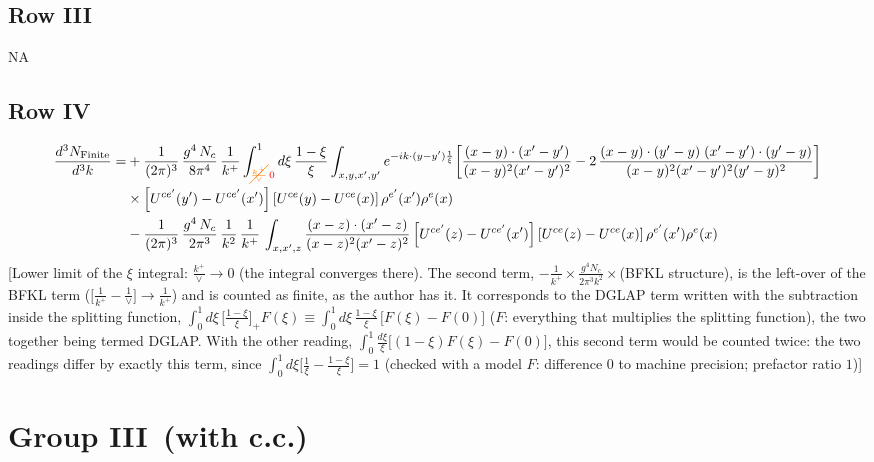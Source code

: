 \documentclass[9pt]{article}
\numberwithin{equation}{section}
\begin{document}
\subsection{Row III}
\textsc{NA}
\subsection{Row IV}
\begin{align}
\frac{d^{3}N_{\rm Finite}}{d^{3}k}= &  +\frac{1}{(2\pi)^{3}}\,\frac{g^{4}\,N_{c}}{8\pi^{4}}\,\frac{1}{k^{+}}\int_{{\color{orange}\cancel{\frac{k^{+}}{\vee}}}\,{\color{red}0}}^{1}d\xi\,\frac{1-\xi}{\xi}\int_{x,y,x',y'}e^{-ik\cdot(y-y')\frac{1}{\xi}}\bigg[\frac{(x-y)\cdot(x'-y')}{(x-y)^{2}(x'-y')^{2}}-2\,\frac{(x-y)\cdot(y'-y)\;(x'-y')\cdot(y'-y)}{(x-y)^{2}(x'-y')^{2}(y'-y)^{2}}\bigg]\notag\\
&\times\left[U^{ce'}(y') - U^{ce'}(x')\right]\left[U^{ce}(y) - U^{ce}(x)\right]\rho^{e'}(x')\rho^{e}(x)\notag \\ & -\frac{1}{(2\pi)^{3}}\,\frac{g^{4}\,N_{c}}{2\pi^{3}}\,\frac{1}{k^{2}}\,\frac{1}{k^{+}}\,\int_{x,x',z}\frac{(x-z)\cdot(x'-z)}{(x-z)^{2}(x'-z)^{2}}\left[U^{ce'}(z) - U^{ce'}(x')\right]\left[U^{ce}(z) - U^{ce}(x)\right]\rho^{e'}(x')\rho^{e}(x)
\end{align} {\color{red}[Lower limit of the $\xi$ integral: $\frac{k^{+}}{\vee}\to0$ (the integral converges there). The second term, $-\frac{1}{k^{+}}\times\frac{g^{4}N_{c}}{2\pi^{3}k^{2}}\times$(BFKL structure), is the left-over of the BFKL term ($\big[\frac{1}{k^{+}}-\frac{1}{\vee}\big]\to\frac{1}{k^{+}}$) and is counted as finite, as the author has it. It corresponds to the DGLAP term written with the subtraction inside the splitting function, $\int_{0}^{1}d\xi\,\big[\frac{1-\xi}{\xi}\big]_{+}F(\xi)\equiv\int_{0}^{1}d\xi\,\frac{1-\xi}{\xi}\,\big[F(\xi)-F(0)\big]$ ($F$: everything that multiplies the splitting function), the two together being termed DGLAP. With the other reading, $\int_{0}^{1}\frac{d\xi}{\xi}\big[(1-\xi)F(\xi)-F(0)\big]$, this second term would be counted twice: the two readings differ by exactly this term, since $\int_{0}^{1}d\xi\big[\frac{1}{\xi}-\frac{1-\xi}{\xi}\big]=1$ (checked with a model $F$: difference $0$ to machine precision; prefactor ratio $1$)]}\par\noindent
\section{Group III\, (with c.c.)}
\end{document}

